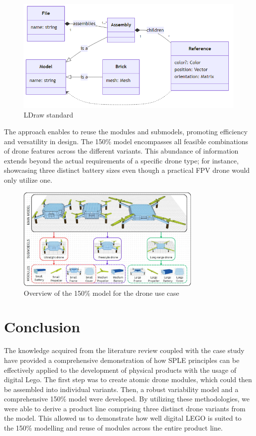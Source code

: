 \documentclass[sigconf,review]{acmart}
\begin{document}
\begin{figure}[htbp]
    \includegraphics[width=\columnwidth]{./ldraw-standard.png}
    \caption{LDraw standard}
    \label{fig:ldraw-standard}
\end{figure}

The approach enables to reuse the modules and submodels, promoting efficiency and versatility in design. 
The 150\% model encompasses all feasible combinations of drone features across the different variants. 
This abundance of information extends beyond the actual requirements of a specific drone type; for instance, showcasing three distinct battery sizes even though a practical FPV drone would only utilize one.

\begin{figure}[htbp]
    \includegraphics[width=0.8\textwidth]{./150_MODEL_6.jpg}
    \caption{Overview of the 150\% model for the drone use case}
    \label{fig:150-model}
\end{figure}

\section{Conclusion}
\label{sec:conclusion}

The knowledge acquired from the literature review coupled with the case study have provided a comprehensive demonstration of how SPLE principles can be effectively applied to the development of physical products with the usage of digital Lego. 
The first step was to create atomic drone modules, which could then be assembled into individual variants. 
Then, a robust variability model and a comprehensive 150\% model were developed. 
By utilizing these methodologies, we were able to derive a product line comprising three distinct drone variants from the model. 
This allowed us to demonstrate how well digital LEGO is suited to the 150\% modelling and reuse of modules across the entire product line.
\end{document}
